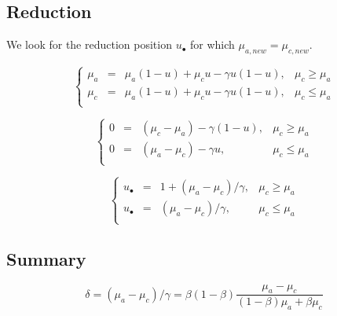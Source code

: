 \documentclass[aps,12pt]{revtex4}
\begin{document}
\subsection{Reduction}
We look for the reduction position $u_\bullet$ for which $\mu_{a,new}=\mu_{c,new}$.

\begin{equation}
\left\lbrace
\begin{array}{rcll}
	\mu_a & = & \mu_a (1-u) + \mu_c u - \gamma u(1-u) , & \mu_c \geq \mu_a\\
	\mu_c & = & \mu_a (1-u) + \mu_c u - \gamma u(1-u) , & \mu_c \leq \mu_a\\
\end{array}
\right.
\end{equation}	 

\begin{equation}
\left\lbrace
\begin{array}{rcll}
	0     & = &    (\mu_c-\mu_a)  - \gamma (1-u), & \mu_c \geq \mu_a\\
	0 & = & (\mu_a -\mu_c)   - \gamma u         , & \mu_c \leq \mu_a\\
\end{array}
\right.
\end{equation}	 

\begin{equation}
\left\lbrace
\begin{array}{rcll}
	u_\bullet    & = &   1+ (\mu_a-\mu_c) / \gamma, & \mu_c \geq \mu_a\\
	u_\bullet   & = & (\mu_a -\mu_c)/\gamma,       & \mu_c \leq \mu_a\\
\end{array}
\right.
\end{equation}	

\subsection{Summary}
\begin{equation}
\delta = (\mu_a -\mu_c)/\gamma = \beta(1-\beta)
	\dfrac{\mu_a-\mu_c}{(1-\beta)\mu_a + \beta \mu_c}
\end{equation}
\end{document}
